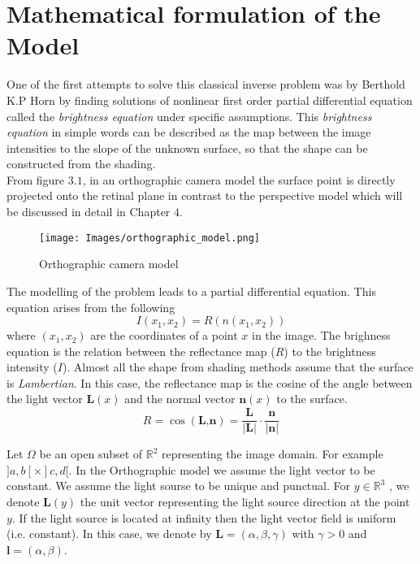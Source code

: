 
\section{Mathematical formulation of the Model}
One of the first attempts to solve this classical inverse problem was by Berthold K.P Horn by finding solutions of nonlinear first order partial differential equation called the \emph{brightness equation} under specific assumptions. This \emph{brightness equation} in simple words can be described as the map between the image intensities to the slope of the unknown surface, so that the shape can be constructed from the shading.\\

\noindent From figure $3.1$, in an orthographic camera model the surface point is directly projected onto the retinal plane in contrast to the perspective model which will be discussed in detail in Chapter $4$.\\

  \begin{figure}[h!]
  	\centering
  	\texttt{[image: Images/orthographic\_model.png]}
  	\caption{Orthographic camera model}
  \end{figure}
\pagebreak

\noindent The modelling of the problem leads to a partial differential equation. This equation arises from the following
\begin{equation}
I(x_1,x_2) = R(n(x_1,x_2))
\end{equation}	
where $(x_1,x_2)$ are the coordinates of a point $x$ in the image. The brighness equation is the relation between the reflectance map ($R$) to the brightness intensity ($I$). Almost all the shape from shading methods assume that the surface is \emph{Lambertian}. In this case, the reflectance map is the cosine of the angle between the light vector $\textbf{L}(x)$ and the normal vector $\textbf{n}(x)$ to the surface.
\begin{equation}
R = \cos(\textbf{L,n}) = \frac{\textbf{L}}{\lvert\textbf{L}\rvert}\cdot \frac{\textbf{n}}{\lvert\textbf{n}\rvert}
\end{equation}

\noindent Let $\Omega$ be an open subset of $ \mathbb{R}^2$ representing the image domain. For example $]a,b[ \times ]c,d[$.
\noindent In the Orthographic model we assume the light vector to be constant. We assume the light sourse to be unique and punctual. For $y \in \mathbb{R}^3$ , we denote $\mathbf{L}(y)$ the unit vector representing the light source direction at the point $y$. If the light source is located at infinity then the light vector field is uniform (i.e. constant). In this case, we denote by $\textbf{L} = (\alpha, \beta, \gamma)$ with $\gamma > 0$ and $\textbf{l} = (\alpha ,\beta)$. \\

